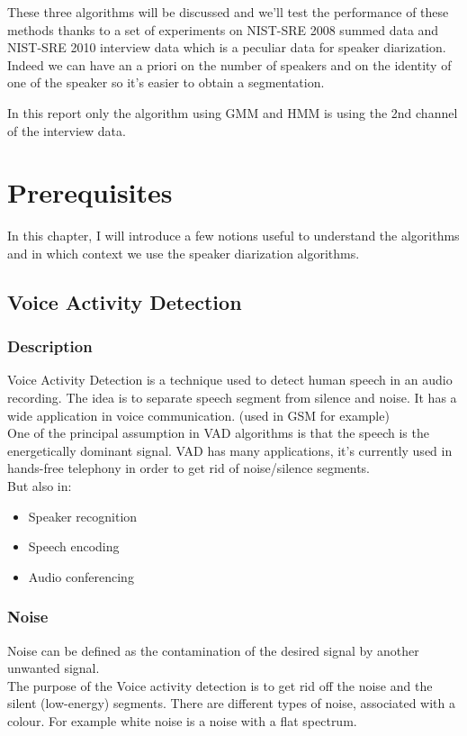 \documentclass{techrep} %
\begin{document}
These three algorithms will be discussed and we'll test the
performance of these methods thanks to a set of experiments on
NIST-SRE 2008 summed data and NIST-SRE 2010 interview data which is a
peculiar data for speaker diarization. Indeed we can have an a priori
on the number of speakers and on the identity of one of the speaker so
it's easier to obtain a segmentation.

In this report only the algorithm using GMM and HMM is using the 2nd
channel of the interview data.

\chapter{Prerequisites}

In this chapter, I will introduce a few notions useful to understand
the algorithms and in which context we use the speaker diarization
algorithms.

\section{Voice Activity Detection}

\subsection{Description}

Voice Activity Detection is a technique used to detect human speech in
an audio recording. The idea is to separate speech segment from
silence and noise. It has a wide application in voice
communication. (used in GSM for example)\\ One of the principal
assumption in VAD algorithms is that the speech is the energetically
dominant signal. VAD has many applications, it's currently used in
hands-free telephony in order to get rid of noise/silence
segments.\\ But also in:
\begin{itemize}
\item Speaker recognition
\item Speech encoding
\item Audio conferencing
\end{itemize}

\subsection{Noise}

Noise can be defined as the contamination of the desired signal by
another unwanted signal.\\ The purpose of the Voice activity detection
is to get rid off the noise and the silent (low-energy) segments.
There are different types of noise, associated with a colour. For
example white noise is a noise with a flat spectrum.
\end{document}
